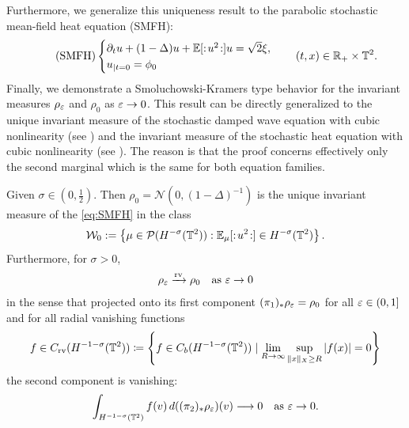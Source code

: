 Furthermore, we generalize this uniqueness result to the parabolic stochastic mean-field heat equation (SMFH):
\begin{align}\tag{SMFH}\label{eq:SMFH}
\begin{cases}
 \partial_t u + (1 - \Delta) u + \mathbb{E}[:\! u^2 \!:]u   = \sqrt{2}\xi,    \\
u_{| t=0} =\phi _0
\end{cases}
\quad (t,x ) \in \mathbb{R}_+ \times \mathbb{T}^2.
\end{align}
Finally, we demonstrate a Smoluchowski-Kramers type behavior for the invariant measures $\rho_\varepsilon$ and $\rho_0$ as $\varepsilon \to 0$.
This result can be directly generalized to the unique invariant measure of the stochastic damped wave equation with cubic nonlinearity (see \cite{tolomeo2023ergodicityhyperbolicpphi2model}) and the invariant measure of the stochastic heat equation with cubic nonlinearity (see \cite{TsatsoulisWeber2018}). The reason is that the proof concerns effectively only the second marginal which is the same for both equation families. 
\begin{corollary}\label{theorem:convergence_uniqueness_SMFH}
    Given $\sigma \in (0,\frac{1}{2})$. Then $\rho_0 = \mathcal{N}(0, (1-\Delta)^{-1})$ is the unique invariant measure of the \eqref{eq:SMFH} in the class 
    \begin{align*}
        \mathcal{W}_0:=\left\{
            \mu\in\mathcal P(H^{-\sigma}(\mathbb{T}^2)):
            \mathbb E_\mu[:\! u^2 \!:]\in H^{-\sigma}(\mathbb{T}^2)
        \right\}.
    \end{align*}
    Furthermore, for $\sigma > 0$, 
    \begin{align*}
        \rho_\varepsilon \xrightarrow[]{\mathrm{rv}} \rho_0 \quad \text{as $\varepsilon \to 0$}
    \end{align*}
    in the sense that projected onto its first component $(\pi_1)_* \rho_\varepsilon = \rho_0$ for all $\varepsilon \in (0,1]$ and for all radial vanishing functions
    \begin{align*}
        f \in C_{\mathrm{rv}}(H^{-1-\sigma}(\mathbb{T}^2))
    \coloneqq
    \left\{
        f\in C_b(H^{-1-\sigma}(\mathbb{T}^2)) \mid
        \lim_{R\to\infty}
        \sup_{\|x\|_X\geq R}|f(x)|=0
    \right\}
    \end{align*}
    the second component is vanishing:
    \begin{align*}
        \int_{H^{-1-\sigma}(\mathbb{T}^2)}
        f(v)\,d((\pi_2)_*\rho_\varepsilon)(v)
        \longrightarrow 0 \quad \text{as $\varepsilon \to 0$}.
    \end{align*}
\end{corollary}

